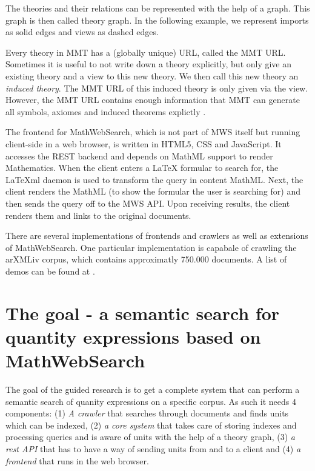 \documentclass[11pt]{article}
\begin{document}
The theories and their relations can be represented with the help of a graph. This graph is then called theory graph. In the following example, we represent imports as solid edges and views as dashed edges. 

Every theory in MMT has a (globally unique) URL, called the MMT URL. Sometimes it is useful to not write down a theory explicitly, but only give an existing theory and a view to this new theory. We then call this new theory an \textit{induced theory}. The MMT URL of this induced theory is only given via the view. However, the MMT URL contains enough information that MMT can generate all symbols, axiomes and induced theorems explictly \cite{IanKohProd:rassmk14}.


The frontend for MathWebSearch, which is not part of MWS itself but running client-side in a web browser, is written in HTML5, CSS and JavaScript. It accesses the REST backend and depends on MathML support to render Mathematics. When the client enters a \LaTeX{} formular to search for, the \LaTeX{}ml daemon \cite{latexml-daemon} is used to transform the query in content MathML. Next, the client renders the MathML (to show the formular the user is searching for) and then sends the query off to the MWS API. Upon receiving results, the client renders them and links to the original documents.

There are several implementations of frontends and crawlers as well as extensions of MathWebSearch. One particular implementation is capabale of crawling the arXMLiv corpus, which contains approximatly 750.000 documents. A list of demos can be found at \cite{URL:MWSDemo}.



\section{The goal - a semantic search for quantity expressions based on MathWebSearch}
\label{sec:extension}

The goal of the guided research is to get a complete system that can perform a semantic search of quanity expressions on a specific corpus.  As such it needs 4 components: (1) \textit{A crawler} that searches through documents and finds units which can be indexed, (2) \textit{a core system} that takes care of storing indexes and processing queries and is aware of units with the help of a theory graph, (3) \textit{a rest API} that has to have a way of sending units from and to a client and (4) \textit{a frontend} that runs in the web browser.
\end{document}
